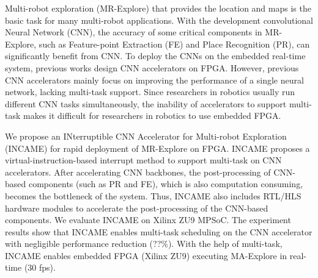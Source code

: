 Multi-robot exploration (MR-Explore) that provides the location and maps is the basic task for many multi-robot applications. 
With the development convolutional Neural Network (CNN), the accuracy of some critical components in MR-Explore, such as Feature-point Extraction (FE) and Place Recognition (PR), can significantly benefit from CNN. 
To deploy the CNNs on the embedded real-time system, previous works design CNN accelerators on FPGA. 
However, previous CNN accelerators mainly focus on improving the performance of a single neural network, lacking multi-task support.
Since researchers in robotics usually run different CNN tasks simultaneously, the inability of accelerators to support multi-task makes it difficult for researchers in robotics to use embedded FPGA.

We propose an INterruptible CNN Accelerator for Multi-robot Exploration (INCAME) for rapid deployment of MR-Explore on FPGA.
INCAME proposes a virtual-instruction-based interrupt method to support multi-task on CNN accelerators.
After accelerating  CNN backbones, the post-processing of  CNN-based components (such as PR and FE), which is also computation consuming, becomes the bottleneck of the system.
Thus, INCAME also includes RTL/HLS hardware modules to accelerate the post-processing of the CNN-based components.
We evaluate INCAME on Xilinx ZU9 MPSoC. The experiment results show that INCAME enables multi-task scheduling on the CNN accelerator with negligible performance reduction (??\%). With the help of multi-task, INCAME enables embedded FPGA (Xilinx ZU9) executing MA-Explore in real-time (30 fps).

